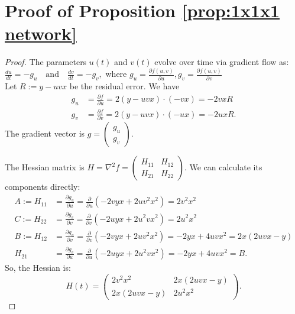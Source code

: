 \documentclass[a4paper,11pt]{article}
\newcommand{\1}{\mathbbm{1}}
\theoremstyle{plain}
\begin{document}
\section{Proof of Proposition \ref{prop:1x1x1 network}}
\label{app:1x1x1 network}
\propsimplenetwork*


\begin{proof}
The parameters $u(t)$ and $v(t)$ evolve over time via gradient flow as:
$
\frac{du}{dt} = -g_u \quad \text{and} \quad \frac{dv}{dt} = -g_v,
$
where $g_u = \frac{\partial f(u,v)}{\partial u}, g_v = \frac{\partial f(u,v)}{\partial v}$\\
Let $R := y - uvx$ be the residual error. We have
\begin{align*}
    g_u &= \frac{\partial f}{\partial u} = 2(y - uvx) \cdot (-vx) = -2vx R \\
    g_v &= \frac{\partial f}{\partial v} = 2(y - uvx) \cdot (-ux) = -2ux R.
\end{align*}
The gradient vector is $g = \begin{pmatrix} g_u \\ g_v \end{pmatrix}$.


The Hessian matrix is $H = \nabla^2 f = \begin{pmatrix} H_{11} & H_{12} \\ H_{21} & H_{22} \end{pmatrix}$. We can calculate its components directly:
\begin{align*}
    A := H_{11} &= \frac{\partial g_u}{\partial u} = \frac{\partial}{\partial u}(-2vyx + 2u v^2 x^2) = 2v^2x^2 \\
    C := H_{22} &= \frac{\partial g_v}{\partial v} = \frac{\partial}{\partial v}(-2uyx + 2u^2 v x^2) = 2u^2x^2 \\
    B := H_{12} &= \frac{\partial g_u}{\partial v} = \frac{\partial}{\partial v}(-2vyx + 2u v^2 x^2) = -2yx + 4uvx^2 = 2x(2uvx - y) \\
    H_{21} &= \frac{\partial g_v}{\partial u} = \frac{\partial}{\partial u}(-2uyx + 2u^2 v x^2) = -2yx + 4uvx^2 = B.
\end{align*}
So, the Hessian is:
\begin{equation*}
    H(t) = \begin{pmatrix} 2v^2x^2 & 2x(2uvx - y) \\ 2x(2uvx - y) & 2u^2x^2 \end{pmatrix}.
\end{equation*}



\end{proof}
\end{document}
